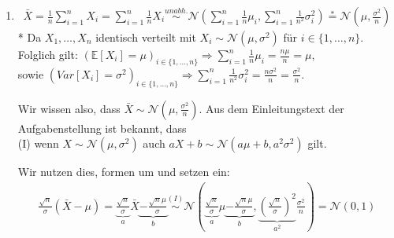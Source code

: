 \documentclass[a4paper]{scrartcl}
\def \blattnr {7}
\begin{document}
\begin{enumerate}[label=\bfseries \blattnr.\arabic*]
\begin{enumerate}
\item 

\begin{equation*}
  \begin{split}
\bar{X} 
= \frac1n \sum_{i=1}^n X_i 
= \sum_{i=1}^n \frac1n X_i 
\stackrel{unabh.}{\sim} \mathcal{N}\left( \sum_{i=1}^n \frac1n \mu_i, \sum_{i=1}^n \frac1{n^2} \sigma_i^2 \right)
\stackrel{*}{=} \mathcal{N}\left( \mu, \frac{\sigma^2}{n} \right)
 \end{split}
\end{equation*}
* Da $X_1, \ldots, X_n$ identisch verteilt mit $X_i \sim \mathcal{N}(\mu, \sigma^2)$ für $i \in \{1,\ldots, n\}$.
Folglich gilt: $(\mathbb{E}[X_i]=\mu)_{i \in \{1,\ldots, n\}} \Rightarrow \sum_{i=1}^n \frac1n \mu_i = \frac{n\mu}n = \mu$,
\\sowie $(Var[X_i] = \sigma^2)_{i \in \{1,\ldots, n\}} \Rightarrow \sum_{i=1}^n \frac1{n^2} \sigma_i^2 = \frac{n\sigma^2}n = \frac{\sigma^2}n$.

Wir wissen also, dass $\bar{X} \sim \mathcal{N}(\mu, \frac{\sigma^2}n)$. 
Aus dem Einleitungstext der Aufgabenstellung ist bekannt, dass 
\\(I) wenn $X \sim \mathcal{N}(\mu,\sigma^2)$ auch $aX+b \sim \mathcal{N}(a\mu+b,a^2\sigma^2)$ gilt.


Wir nutzen dies, formen um und setzen ein:
\begin{equation*}
  \begin{split}
\frac{\sqrt{n}}\sigma \left( \bar{X} - \mu \right)
= \underbrace{\frac{\sqrt{n}}\sigma}_{a} \bar{X} \underbrace{- \frac{\sqrt{n} \mu}\sigma}_{b}
\stackrel{(I)}{\sim} \mathcal{N}\left( \underbrace{\frac{\sqrt{n}}\sigma}_{a} \mu \underbrace{- \frac{\sqrt{n} \mu}\sigma}_{b}, 
    \underbrace{\left(\frac{\sqrt{n}}\sigma \right)^2}_{a^2} \frac{\sigma^2}n \right) 
=\mathcal{N}(0,1)
  \end{split}
\end{equation*}



\end{enumerate}

\end{enumerate}
\end{document}
